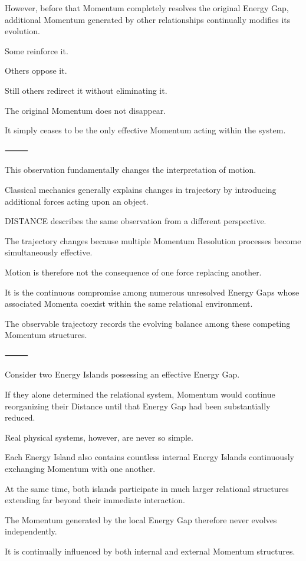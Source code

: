 However, before that Momentum completely resolves the original Energy Gap, additional Momentum generated by other relationships continually modifies its evolution.

Some reinforce it.

Others oppose it.

Still others redirect it without eliminating it.

The original Momentum does not disappear.

It simply ceases to be the only effective Momentum acting within the system.

⸻

This observation fundamentally changes the interpretation of motion.

Classical mechanics generally explains changes in trajectory by introducing additional forces acting upon an object.

DISTANCE describes the same observation from a different perspective.

The trajectory changes because multiple Momentum Resolution processes become simultaneously effective.

Motion is therefore not the consequence of one force replacing another.

It is the continuous compromise among numerous unresolved Energy Gaps whose associated Momenta coexist within the same relational environment.

The observable trajectory records the evolving balance among these competing Momentum structures.

⸻

Consider two Energy Islands possessing an effective Energy Gap.

If they alone determined the relational system, Momentum would continue reorganizing their Distance until that Energy Gap had been substantially reduced.

Real physical systems, however, are never so simple.

Each Energy Island also contains countless internal Energy Islands continuously exchanging Momentum with one another.

At the same time, both islands participate in much larger relational structures extending far beyond their immediate interaction.

The Momentum generated by the local Energy Gap therefore never evolves independently.

It is continually influenced by both internal and external Momentum structures.

